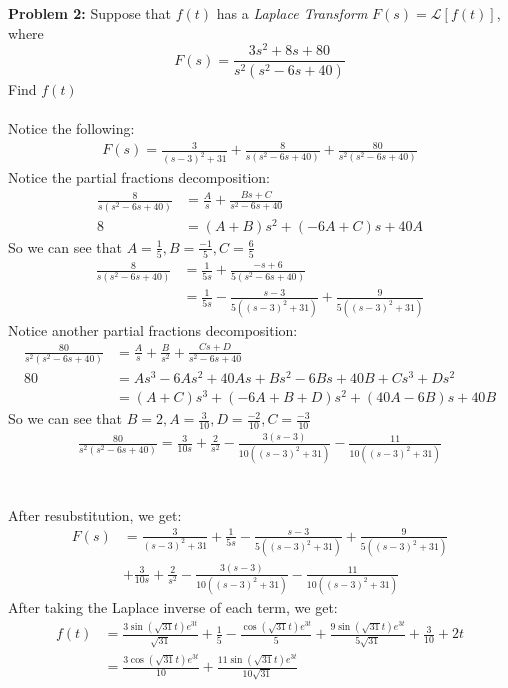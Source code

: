 \documentclass[12pt]{article}
\begin{document}
\noindent \textbf{Problem 2: }Suppose that $f(t)$ has a \textit{Laplace Transform} $F(s) = \mathcal{L}[f(t)]$, where
	$$
	F(s) = \frac{3s^2 + 8s + 80}{s^2(s^2 - 6s + 40)}
	$$
Find $f(t)$
\\ \\
Notice the following:
	\begin{align*}
		F(s) = \frac{3}{(s-3)^2 + 31} + \frac{8}{s(s^2 - 6s + 40)} + \frac{80}{s^2(s^2 - 6s + 40)}
	\end{align*}	
Notice the partial fractions decomposition:
	\begin{align*}
		\frac{8}{s(s^2 - 6s + 40)} &= \frac{A}{s} + \frac{Bs + C}{s^2 - 6s + 40} \\
		8 &= (A+B)s^2 + (-6A + C)s + 40A 
	\end{align*}
So we can see that $A = \frac{1}{5}, B  = \frac{-1}{5}, C = \frac{6}{5}$
	\begin{align*}
	\frac{8}{s(s^2 - 6s + 40)} &= \frac{1}{5s} + \frac{-s + 6}{5(s^2 - 6s + 40)} \\
	&= \frac{1}{5s} - \frac{s-3}{5((s-3)^2 + 31)} + \frac{9}{5((s-3)^2 + 31)}
	\end{align*}
Notice another partial fractions decomposition:
	\begin{align*}
		\frac{80}{s^2(s^2 - 6s + 40)} &= \frac{A}{s} + \frac{B}{s^2} + \frac{Cs + D}{s^2 - 6s + 40} \\
		80 &= As^3 - 6As^2 + 40As + Bs^2 - 6Bs + 40B + Cs^3 + Ds^2 \\
		&= (A+C)s^3 + (-6A + B + D)s^2 + (40A - 6B)s + 40B
	\end{align*}
So we can see that $B = 2, A = \frac{3}{10}, D= \frac{-2}{10}, C = \frac{-3}{10}$
	\begin{align*}
		\frac{80}{s^2(s^2 - 6s + 40)} = \frac{3}{10s} + \frac{2}{s^2} - \frac{3(s-3)}{10((s-3)^2 + 31)} - \frac{11}{10((s-3)^2 + 31)}
	\end{align*}
\\ \\
After resubstitution, we get:
	\begin{align*}
		F(s) &= \frac{3}{(s-3)^2 + 31} + \frac{1}{5s} - \frac{s-3}{5((s-3)^2 + 31)} + \frac{9}{5((s-3)^2 + 31)} \\
		&+ \frac{3}{10s} + \frac{2}{s^2} -  \frac{3(s-3)}{10((s-3)^2 + 31)} - \frac{11}{10((s-3)^2 + 31)}
	\end{align*} 
After taking the Laplace inverse of each term, we get:
	\begin{align*}
		f(t) &= \frac{3\sin(\sqrt{31}t)e^{3t}}{\sqrt{31}} + \frac{1}{5} - \frac{\cos(\sqrt{31}t)e^{3t}}{5} + \frac{9\sin(\sqrt{31}t)e^{3t}}{5\sqrt{31}} + \frac{3}{10} + 2t \\
		&= \frac{3\cos(\sqrt{31}t)e^{3t}}{10} + \frac{11\sin(\sqrt{31}t)e^{3t}}{10\sqrt{31}}
	\end{align*}
	
\end{document}
